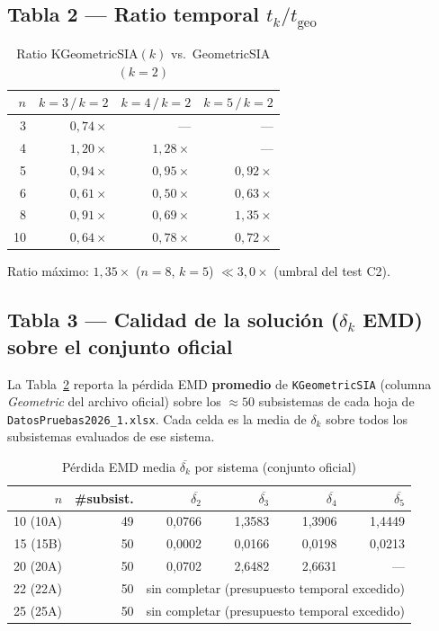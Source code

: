 \documentclass[12pt,letterpaper]{article}
\theoremstyle{definition}
\theoremstyle{remark}
\begin{document}
\subsection{Tabla 2 --- Ratio temporal $t_k / t_{\mathrm{geo}}$}

\begin{table}[ht]
\centering
\caption{Ratio KGeometricSIA$(k)$ vs.\ GeometricSIA$(k=2)$}
\label{tab:ratio}
\begin{tabular}{@{}r r r r@{}}
\toprule
$n$ & $k=3\,/\,k=2$ & $k=4\,/\,k=2$ & $k=5\,/\,k=2$ \\
\midrule
3  & $0{,}74\times$ & --- & --- \\
4  & $1{,}20\times$ & $1{,}28\times$ & --- \\
5  & $0{,}94\times$ & $0{,}95\times$ & $0{,}92\times$ \\
6  & $0{,}61\times$ & $0{,}50\times$ & $0{,}63\times$ \\
8  & $0{,}91\times$ & $0{,}69\times$ & $1{,}35\times$ \\
10 & $0{,}64\times$ & $0{,}78\times$ & $0{,}72\times$ \\
\bottomrule
\end{tabular}
\end{table}

Ratio máximo: $1{,}35\times$ ($n=8$, $k=5$) $\ll 3{,}0\times$ (umbral del test C2).

\subsection{Tabla 3 --- Calidad de la solución ($\delta_k$ EMD) sobre el conjunto oficial}

La Tabla~\ref{tab:calidad} reporta la pérdida EMD \textbf{promedio} de \texttt{KGeometricSIA}
(columna \emph{Geometric} del archivo oficial) sobre los $\approx 50$ subsistemas de cada hoja
de \texttt{DatosPruebas2026\_1.xlsx}. Cada celda es la media de $\delta_k$ sobre todos los
subsistemas evaluados de ese sistema.

\begin{table}[ht]
\centering
\caption{Pérdida EMD media $\overline{\delta_k}$ por sistema (conjunto oficial)}
\label{tab:calidad}
\begin{tabular}{@{}r r r r r r@{}}
\toprule
$n$ & \#subsist. & $\overline{\delta_2}$ & $\overline{\delta_3}$ & $\overline{\delta_4}$ & $\overline{\delta_5}$ \\
\midrule
10 (10A) & 49 & 0{,}0766 & 1{,}3583 & 1{,}3906 & 1{,}4449 \\
15 (15B) & 50 & 0{,}0002 & 0{,}0166 & 0{,}0198 & 0{,}0213 \\
20 (20A) & 50 & 0{,}0702 & 2{,}6482 & 2{,}6631 & --- \\
22 (22A) & 50 & \multicolumn{4}{c}{sin completar (presupuesto temporal excedido)} \\
25 (25A) & 50 & \multicolumn{4}{c}{sin completar (presupuesto temporal excedido)} \\
\bottomrule
\end{tabular}
\end{table}
\end{document}
